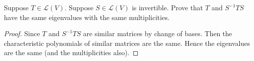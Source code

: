 Suppose $T \in \mathcal{L}(V)$. Suppose $S \in \mathcal{L}(V)$ is invertible.  Prove that $T$ and $S^{-1}TS$ have the same eigenvalues with the same multiplicities.

\begin{proof}
    Since $T$ and $S^{-1}TS$ are similar matrices by change of bases. Then the characteristic polynomials of similar matrices are the same. Hence the eigenvalues are the same (and the multiplicities also).
\end{proof}